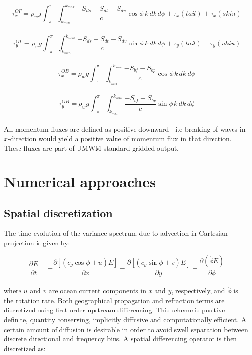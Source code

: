 \documentclass[letterpaper]{article}
\numberwithin{equation}{section}
\begin{document}
\begin{equation}
\tau_{x}^{OT}=\rho_{w}g\int_{-\pi}^{\pi}\!\int_{k_{min}}^{k_{max}}\dfrac{-S_{ds}-S_{dt}-S_{dv}}{c}\cos{\phi}\,k\,dk\,d\phi 
+ \tau_{x}(tail) + \tau_{x}(skin) 
\end{equation}
\\
\begin{equation}
\tau_{y}^{OT}=\rho_{w}g\int_{-\pi}^{\pi}\!\int_{k_{min}}^{k_{max}}\dfrac{-S_{ds}-S_{dt}-S_{dv}}{c}\sin{\phi}\,k\,dk\,d\phi 
+ \tau_{y}(tail) + \tau_{y}(skin) 
\end{equation}
\\
\begin{equation}
\tau_{x}^{OB}=\rho_{w}g\int_{-\pi}^{\pi}\!\int_{k_{min}}^{k_{max}}\dfrac{-S_{bf}-S_{bp}}{c}\cos{\phi}\,k\,dk\,d\phi
\end{equation}
\\
\begin{equation}
\tau_{y}^{OB}=\rho_{w}g\int_{-\pi}^{\pi}\!\int_{k_{min}}^{k_{max}}\dfrac{-S_{bf}-S_{bp}}{c}\sin{\phi}\,k\,dk\,d\phi
\end{equation}
\\
All momentum fluxes are defined as positive downward - i.e breaking of waves
in $x$-direction would yield a positive value of momentum flux in that direction.
These fluxes are part of UMWM standard gridded output.

\newpage
\section{Numerical approaches}

\subsection{Spatial discretization}

The time evolution of the variance spectrum due to advection in Cartesian projection is given by:

\begin{equation}
\dfrac{\partial E}{\partial t} = 
-\dfrac{\partial [(c_{g}\cos{\phi}+u)E]}{\partial x} 
-\dfrac{\partial [(c_{g}\sin{\phi}+v)E]}{\partial y} 
-\dfrac{\partial (\dot{\phi}E)}{\partial \phi}
\end{equation}
\\
where $u$ and $v$ are ocean current components in $x$ and $y$, respectively, and $\dot{\phi}$ is the rotation rate.
Both geographical propagation and refraction terms are discretized using first order upstream differencing.
This scheme is positive-definite, quantity conserving, 
implicitly diffusive and computationally efficient.
A certain amount of diffusion is desirable in order to avoid swell separation between discrete directional and frequency bins.
A spatial differencing operator is then discretized as:
\end{document}
